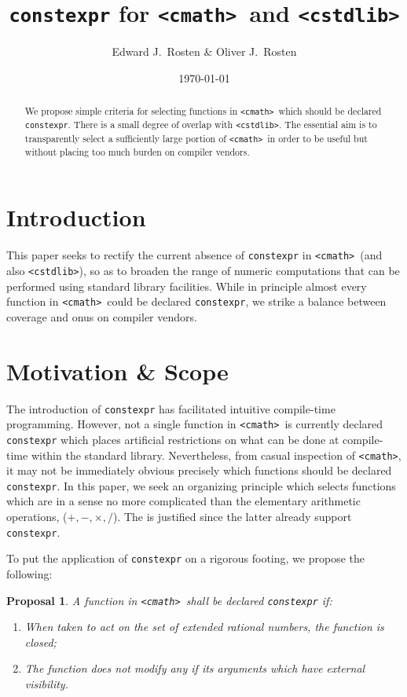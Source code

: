 \documentclass[prd,preprint,amsmath,amssymb,nofootinbib,eqsecnum]{revtex4-1}
\newcommand{\constexpr}{\code{constexpr}\xspace}
\newcommand{\code}[1]{{\tt #1}}
\newcommand{\header}[1]{{\tt <#1>}}
\newcommand{\cmath}{\header{cmath}}
\newcommand{\cstdlib}{\header{cstdlib}}
\newcommand{\Operators}{\ensuremath{+,-,\times,/}}
\newtheorem*{proposal*}{Proposal}
\begin{document}
\title{\constexpr for \cmath\ and \cstdlib}
\author{Edward J.~Rosten \& Oliver J.~Rosten}
\date{\today}

\begin{abstract}

We propose simple criteria for selecting functions in \cmath\ which should be
declared \constexpr. There is a small degree of overlap with \cstdlib.
 The essential aim is to transparently select a sufficiently large portion of \cmath\ 
in order to be useful but without placing too much burden on compiler vendors.
	
\end{abstract}


\maketitle

\tableofcontents

\section{Introduction}

This paper seeks to rectify the current absence of \constexpr in
\cmath\ (and also \cstdlib), so as to broaden the range of numeric computations that can be
performed using standard library facilities. While in principle almost every function
in \cmath\ could be declared \constexpr, we strike a balance between coverage and onus on compiler vendors.


\section{Motivation \& Scope}

The introduction of \constexpr has facilitated intuitive compile-time
programming. However, not a single function in \cmath\ is currently declared \constexpr which places
artificial restrictions on what can be done at compile-time within the standard library.
Nevertheless, from casual inspection of \cmath, it may
not be immediately obvious precisely which functions should be declared
\constexpr. In this paper, we seek an organizing principle which selects functions
which are in a sense no more complicated than the elementary arithmetic operations,
(\Operators). The is justified since the latter already support \constexpr.

To put the application of \constexpr on a rigorous footing, we
propose the following:
\begin{proposal*}
	A function in \cmath\ shall be declared \constexpr if:
	\begin{enumerate}
		\item When taken to act on the set of extended rational numbers, the function is closed;
		
		\item The function does not modify any if its arguments which have external visibility.
	\end{enumerate}
\end{proposal*}
\end{document}

